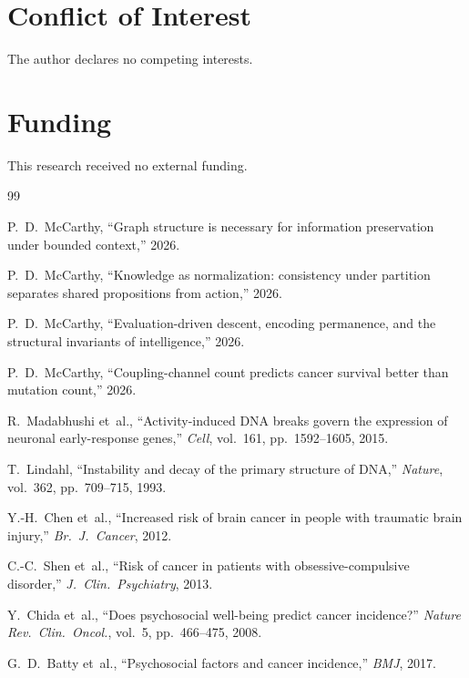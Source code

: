 \documentclass[11pt]{article}
\theoremstyle{definition}
\begin{document}
\section*{Conflict of Interest}
The author declares no competing interests.

\section*{Funding}
This research received no external funding.


\begin{thebibliography}{99}

P.~D.~McCarthy, ``Graph structure is necessary for information
preservation under bounded context,'' 2026.

P.~D.~McCarthy, ``Knowledge as normalization: consistency under partition
separates shared propositions from action,'' 2026.

P.~D.~McCarthy, ``Evaluation-driven descent, encoding permanence,
and the structural invariants of intelligence,'' 2026.

P.~D.~McCarthy, ``Coupling-channel count predicts cancer survival
better than mutation count,'' 2026.

R.~Madabhushi et~al., ``Activity-induced {DNA} breaks govern the
expression of neuronal early-response genes,'' \emph{Cell},
vol.~161, pp.~1592--1605, 2015.

T.~Lindahl, ``Instability and decay of the primary structure of
{DNA},'' \emph{Nature}, vol.~362, pp.~709--715, 1993.

Y.-H.~Chen et~al., ``Increased risk of brain cancer in people
with traumatic brain injury,'' \emph{Br.~J.~Cancer}, 2012.

C.-C.~Shen et~al., ``Risk of cancer in patients with obsessive-compulsive
disorder,'' \emph{J.~Clin.~Psychiatry}, 2013.

Y.~Chida et~al., ``Does psychosocial well-being predict cancer
incidence?'' \emph{Nature Rev.~Clin.~Oncol.}, vol.~5,
pp.~466--475, 2008.

G.~D.~Batty et~al., ``Psychosocial factors and cancer incidence,''
\emph{BMJ}, 2017.


\end{thebibliography}
\end{document}
